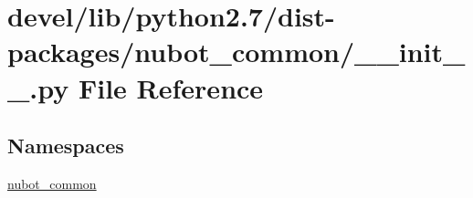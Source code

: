 \hypertarget{devel_2lib_2python2_87_2dist-packages_2nubot__common_2____init_____8py}{\section{devel/lib/python2.7/dist-\/packages/nubot\-\_\-common/\-\_\-\-\_\-init\-\_\-\-\_\-.py File Reference}
\label{devel_2lib_2python2_87_2dist-packages_2nubot__common_2____init_____8py}
}
\subsection*{Namespaces}
\begin{DoxyCompactItemize}
\item 
\hyperlink{namespacenubot__common}{nubot\-\_\-common}
\end{DoxyCompactItemize}
